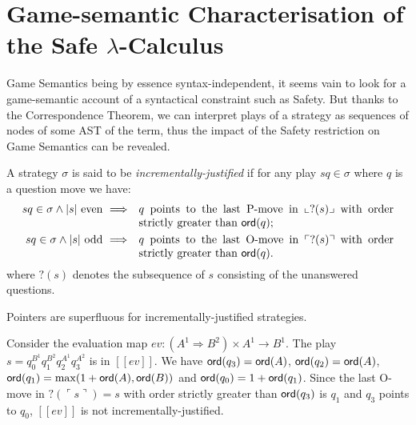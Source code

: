 \documentclass{llncs}
\newcommand\ord[1]{{\sf ord}(#1)}
\newcommand{\sem}[1]{{[\![ #1 ]\!]}}
\newcommand\imp{\Longrightarrow}
\newcommand{\oview}[1]{\llcorner #1 \lrcorner}
\newcommand{\pview}[1]{\ulcorner #1 \urcorner}
\begin{document}
\section{Game-semantic Characterisation of the Safe $\lambda$-Calculus}

Game Semantics being by essence syntax-independent, it seems vain to look for a
game-semantic account of a syntactical constraint such as Safety.
But thanks to the Correspondence Theorem, we can interpret plays of a strategy as
sequences of nodes of some AST of the term, thus
the impact of the Safety restriction on Game Semantics can be revealed.

\begin{definition}
A strategy $\sigma$ is said to be \emph{incrementally-justified}
if for any play $s q \in \sigma$ where $q$ is a question
move we have:
\begin{eqnarray*}
s q \in \sigma \wedge |s| \mbox{ even } &\imp& \parbox[t]{8cm}{$q$ points to the last P-move in $\oview{?(s)}$ with order strictly greater than $\ord{q}$;} \\
s q \in \sigma \wedge |s| \mbox{ odd } &\imp&
\parbox[t]{8cm}{$q$  points to the last O-move in $\pview{?(s)}$
with order strictly greater than $\ord{q}$.}
\end{eqnarray*}
where $?(s)$ denotes the subsequence of $s$ consisting of the unanswered questions.
\end{definition}

\begin{lemma}
\label{lem:incrjustified_pointers_uniqu_recover} Pointers are
superfluous for incrementally-justified strategies.
\end{lemma}

\begin{example}
Consider the evaluation map $ev : (A^1 \Rightarrow B^2) \times  A^1 \rightarrow B^1$.
The play $s = q_0^{B^1} q_1^{B^2} q_2^{A^1} q_3^{A^2}$ is in $\sem{ev}$. We have $\ord{q_3} = \ord{A}$,
$\ord{q_2} = \ord{A}$, $\ord{q_1} = \max( 1+\ord{A}, \ord{B})$ and
$\ord{q_0} = 1 + \ord{q_1}$. Since the last O-move in $?(\pview{s})= s$
with order strictly greater than $\ord{q_3}$ is $q_1$ and $q_3$ points to $q_0$, $\sem{ev}$ is not incrementally-justified.
\end{example}
\end{document}
